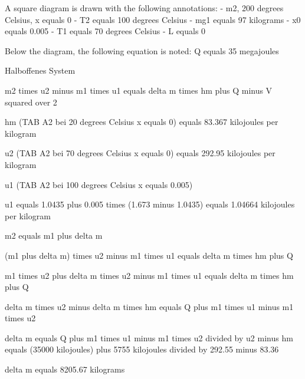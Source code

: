 A square diagram is drawn with the following annotations:
- m2, 200 degrees Celsius, x equals 0
- T2 equals 100 degrees Celsius
- mg1 equals 97 kilograms
- x0 equals 0.005
- T1 equals 70 degrees Celsius
- L equals 0

Below the diagram, the following equation is noted:
Q equals 35 megajoules

Halboffenes System

m2 times u2 minus m1 times u1 equals delta m times hm plus Q minus V squared over 2

hm (TAB A2 bei 20 degrees Celsius x equals 0) equals 83.367 kilojoules per kilogram

u2 (TAB A2 bei 70 degrees Celsius x equals 0) equals 292.95 kilojoules per kilogram

u1 (TAB A2 bei 100 degrees Celsius x equals 0.005)

u1 equals 1.0435 plus 0.005 times (1.673 minus 1.0435) equals 1.04664 kilojoules per kilogram

m2 equals m1 plus delta m

(m1 plus delta m) times u2 minus m1 times u1 equals delta m times hm plus Q

m1 times u2 plus delta m times u2 minus m1 times u1 equals delta m times hm plus Q

delta m times u2 minus delta m times hm equals Q plus m1 times u1 minus m1 times u2

delta m equals Q plus m1 times u1 minus m1 times u2 divided by u2 minus hm equals (35000 kilojoules) plus 5755 kilojoules divided by 292.55 minus 83.36

delta m equals 8205.67 kilograms